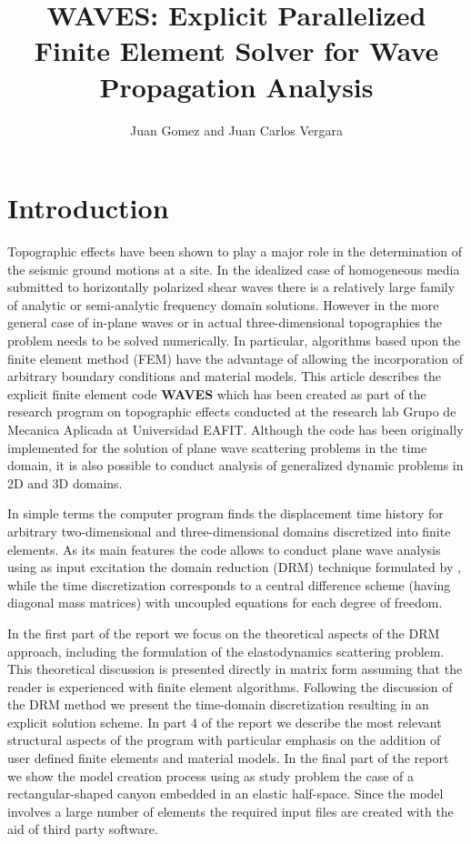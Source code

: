 \documentclass[12pt,letterpaper]{article}
\title{\textbf{WAVES: Explicit Parallelized Finite Element Solver for Wave Propagation Analysis}}
\author{Juan Gomez and Juan Carlos Vergara}
\begin{document}
\maketitle
\section{Introduction}
Topographic effects have been shown to play a major role in the determination of the seismic ground motions at a site. In the idealized case of homogeneous media submitted to horizontally polarized shear waves there is a relatively large family of analytic or semi-analytic frequency domain solutions. However in the more general case of in-plane waves or in actual three-dimensional topographies the problem needs to be solved numerically. In particular, algorithms based upon the finite element method (FEM) have the advantage of allowing the incorporation of arbitrary boundary conditions and material models. This article describes the explicit finite element code {\bf WAVES} which  has been created as part of the research program on topographic effects conducted at the research lab Grupo de Mecanica Aplicada at Universidad EAFIT. Although the code has been originally implemented for the solution of plane wave scattering problems in the time domain, it is also possible to conduct analysis of generalized dynamic problems in 2D and 3D domains. 

In simple terms the computer program finds the displacement time history for arbitrary two-dimensional and three-dimensional domains discretized into finite elements.  As its main features the code allows to conduct plane wave analysis using as input excitation the domain reduction (DRM) technique formulated by \cite{bielak2003}, while the time discretization corresponds to a central difference scheme (having diagonal mass matrices) with uncoupled equations for each degree of freedom. 

In the first part of the report we focus on the theoretical aspects of the DRM approach, including the formulation of the elastodynamics scattering problem. This theoretical discussion is presented directly in matrix form assuming that the reader is experienced with finite element algorithms. Following the discussion of the DRM method we present the time-domain discretization resulting in an explicit solution scheme. In part 4 of the report we describe the most relevant structural aspects of the program with particular emphasis on the addition of user defined finite elements and material models. In the final part of the report we show the model creation process using as study problem the case of a rectangular-shaped canyon embedded in an elastic half-space. Since the model involves a large number of elements the required input files are created with the aid of third party software.
\end{document}
